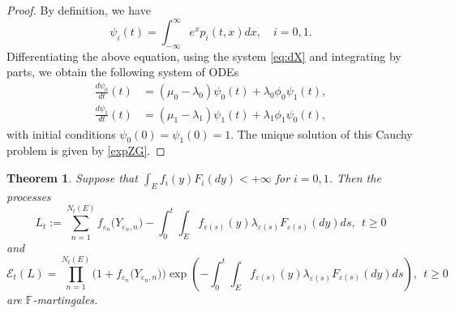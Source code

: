 \documentclass[11pt]{article}
\theoremstyle{plain}
\newtheorem{theorem}{Theorem}[section]
\theoremstyle{definition}
\numberwithin{equation}{section}
\newcommand{\eps}{\varepsilon}
\newcommand{\Fil}{\mathds{F}}
\begin{document}
\begin{proof}
By definition, we have
\begin{equation*}
\psi_i(t)=\int_{-\infty}^\infty e^{x}p_i(t,x)d x,\quad i=0,1.
\end{equation*}
Differentiating the above equation, using the system \eqref{eq:dX} and integrating by parts, we obtain the following system of ODEs
\begin{equation*}
\begin{split}
\frac{d \psi_0}{d t}(t)&=(\mu_0-\lambda_0)\psi_0(t)+\lambda_0\phi_0\psi_1(t),\\
\frac{d \psi_{1}}{d t}(t)&=(\mu_1-\lambda_1)\psi_1(t)+\lambda_1\phi_1\psi_0(t),
\end{split}
\end{equation*}
with initial conditions $\psi_0(0)=\psi_1(0)=1$. The unique solution of this Cauchy problem is given by \eqref{expZG}.
\end{proof}
\begin{theorem}\label{teor:expHQ}
Suppose that $\int_E f_i(y)F_i(dy)<+\infty$ for $i=0,1$. Then the processes
\begin{equation}\label{eq:Ztilde}
L_t:=\sum_{n=1}^{N_t(E)}f_{\eps_n}\bigl(Y_{\eps_n,n}\bigr)-\int_0^t\int_{E}f_{\eps(s)}(y)\lambda_{\eps(s)}F_{\eps(s)}(d y)d s, \ \ t\geq0
\end{equation}
and
\begin{equation}
\mathcal{E}_t(L)=\prod_{n=1}^{N_t(E)}\bigl(1+f_{\eps_n}\bigl(Y_{\eps_n,n}\bigr)\bigr)\exp\left(-\int_0^t\int_{E}f_{\eps(s)}(y)\lambda_{\eps(s)}F_{\eps(s)}(d y)d s\right), \ \ t\geq0
\end{equation}
are $\Fil$-martingales.
\end{theorem}
\end{document}
